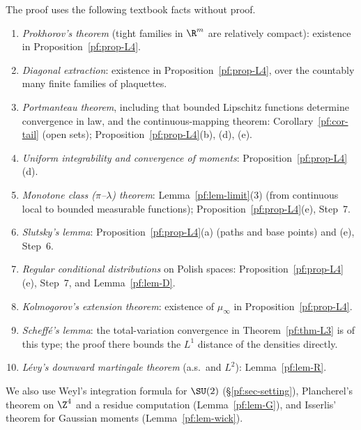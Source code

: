 The proof uses the following textbook facts without proof.
\begin{enumerate}
\item \emph{Prokhorov's theorem} (tight families in $\R^m$ are relatively compact): existence in Proposition~\ref{pf:prop-L4}.
\item \emph{Diagonal extraction}: existence in Proposition~\ref{pf:prop-L4}, over the countably many finite families of plaquettes.
\item \emph{Portmanteau theorem}, including that bounded Lipschitz functions determine convergence in law, and the continuous-mapping theorem: Corollary~\ref{pf:cor-tail} (open sets); Proposition~\ref{pf:prop-L4}(b), (d), (e).
\item \emph{Uniform integrability and convergence of moments}: Proposition~\ref{pf:prop-L4}(d).
\item \emph{Monotone class ($\pi$--$\lambda$) theorem}: Lemma~\ref{pf:lem-limit}(3) (from continuous local to bounded measurable functions); Proposition~\ref{pf:prop-L4}(e), Step~7.
\item \emph{Slutsky's lemma}: Proposition~\ref{pf:prop-L4}(a) (paths and base points) and (e), Step~6.
\item \emph{Regular conditional distributions} on Polish spaces: Proposition~\ref{pf:prop-L4}(e), Step~7, and Lemma~\ref{pf:lem-D}.
\item \emph{Kolmogorov's extension theorem}: existence of $\mu_\infty$ in Proposition~\ref{pf:prop-L4}.
\item \emph{Scheff\'e's lemma}: the total-variation convergence in Theorem~\ref{pf:thm-L3} is of this type; the proof there bounds the $L^1$ distance of the densities directly.
\item \emph{L\'evy's downward martingale theorem} (a.s.\ and $L^2$): Lemma~\ref{pf:lem-R}.
\end{enumerate}
We also use Weyl's integration formula for $\SU(2)$ (\S\ref{pf:sec-setting}), Plancherel's theorem on $\Z^4$ and a residue computation (Lemma~\ref{pf:lem-G}), and Isserlis' theorem for Gaussian moments (Lemma~\ref{pf:lem-wick}).
